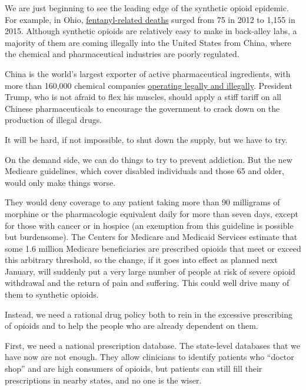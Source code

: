 We are just beginning to see the leading edge of the synthetic opioid
epidemic. For example, in Ohio,
\href{http://www.news-herald.com/article/HR/20170207/NEWS/170209584}{fentanyl-related
deaths} surged from 75 in 2012 to 1,155 in 2015. Although synthetic
opioids are relatively easy to make in back-alley labs, a majority of
them are coming illegally into the United States from China, where the
chemical and pharmaceutical industries are poorly regulated.

China is the world's largest exporter of active pharmaceutical
ingredients, with more than 160,000 chemical companies
\href{https://www.uscc.gov/sites/default/files/Research/USCC\%20Staff\%20Report_Fentanyl-China\%E2\%80\%99s\%20Deadly\%20Export\%20to\%20the\%20United\%20States020117.pdf}{operating
legally and illegally}. President Trump, who is not afraid to flex his
muscles, should apply a stiff tariff on all Chinese pharmaceuticals to
encourage the government to crack down on the production of illegal
drugs.

It will be hard, if not impossible, to shut down the supply, but we have
to try.

On the demand side, we can do things to try to prevent addiction. But
the new Medicare guidelines, which cover disabled individuals and those
65 and older, would only make things worse.

They would deny coverage to any patient taking more than 90 milligrams
of morphine or the pharmacologic equivalent daily for more than seven
days, except for those with cancer or in hospice (an exemption from this
guideline is possible but burdensome). The Centers for Medicare and
Medicaid Services estimate that some 1.6 million Medicare beneficiaries
are prescribed opioids that meet or exceed this arbitrary threshold, so
the change, if it goes into effect as planned next January, will
suddenly put a very large number of people at risk of severe opioid
withdrawal and the return of pain and suffering. This could well drive
many of them to synthetic opioids.

Instead, we need a rational drug policy both to rein in the excessive
prescribing of opioids and to help the people who are already dependent
on them.

First, we need a national prescription database. The state-level
databases that we have now are not enough. They allow clinicians to
identify patients who ``doctor shop'' and are high consumers of opioids,
but patients can still fill their prescriptions in nearby states, and no
one is the wiser.

